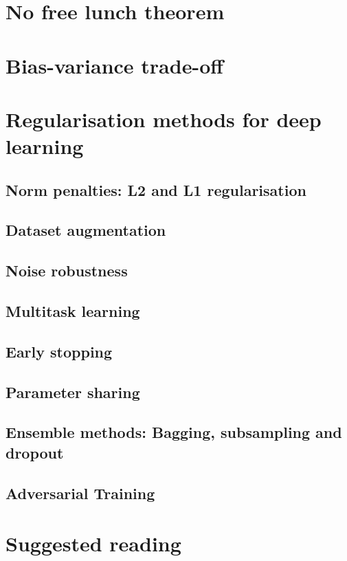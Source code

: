 \section{No free lunch theorem}


\section{Bias-variance trade-off}







\section{Regularisation methods for deep learning}


\subsection{Norm penalties: L2 and L1 regularisation}
\subsection{Dataset augmentation}
\subsection{Noise robustness}
\subsection{Multitask learning}
\subsection{Early stopping}
\subsection{Parameter sharing}
\subsection{Ensemble methods: Bagging, subsampling and dropout}
\subsection{Adversarial Training}


\section{Suggested reading}

